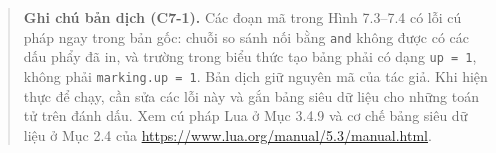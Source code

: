 
\begin{quote}
\small\textbf{Ghi chú bản dịch (C7-1).} Các đoạn mã trong Hình 7.3--7.4 có lỗi cú pháp ngay trong bản gốc: chuỗi so sánh nối bằng \texttt{and} không được có các dấu phẩy đã in, và trường trong biểu thức tạo bảng phải có dạng \texttt{up = 1}, không phải \texttt{marking.up = 1}. Bản dịch giữ nguyên mã của tác giả. Khi hiện thực để chạy, cần sửa các lỗi này và gắn bảng siêu dữ liệu cho những toán tử trên đánh dấu. Xem cú pháp Lua ở Mục 3.4.9 và cơ chế bảng siêu dữ liệu ở Mục 2.4 của \url{https://www.lua.org/manual/5.3/manual.html}.
\end{quote}


